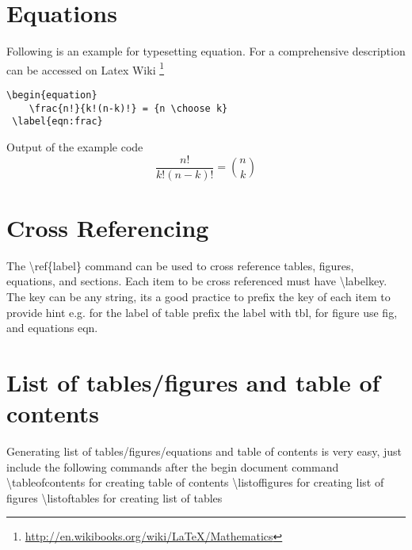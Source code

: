 \section{Equations}
Following is an example for typesetting equation. For a comprehensive description can be accessed on Latex Wiki \footnote{\url{http://en.wikibooks.org/wiki/LaTeX/Mathematics}}

\begin{lstlisting}
\begin{equation}
    \frac{n!}{k!(n-k)!} = {n \choose k}
 \label{eqn:frac}
\end{lstlisting}
Output of the example code
\begin{equation}
 \frac{n!}{k!(n-k)!} = {n \choose k}
 \label{eqn:frac}
\end{equation}

\section{Cross Referencing}
The \textbackslash ref\{label\} command can be used to cross reference tables, figures, equations, and sections. Each item to be cross referenced must have \textbackslash label{key}. The key can be any string, its a good practice to prefix the key of each item to provide hint e.g. for the label of table prefix the label with tbl, for figure use fig, and equations eqn.

\section{List of tables/figures and table of contents}
Generating list of tables/figures/equations and table of contents is very easy, just include the following commands after the begin document command
\textbackslash tableofcontents for creating table of contents
\textbackslash listoffigures for creating  list of figures
\textbackslash listoftables for creating  list of tables

